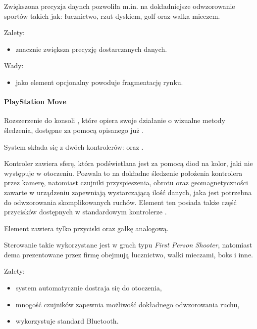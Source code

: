 Zwiększona precyzja daynch pozwoliła m.in. na dokładniejsze odwzorowanie sportów takich jak: łucznictwo, rzut dyskiem, golf oraz walka mieczem.

Zalety:
\begin{itemize}
  \item znacznie zwiększa precyzję dostarczanych danych.
\end{itemize}

Wady:
\begin{itemize}
  \item jako element opcjonalny powoduje fragmentację rynku.
\end{itemize}

\paragraph{PlayStation Move}
Rozszerzenie do konsoli , które opiera swoje działanie o wizualne metody śledzenia, dostępne za pomocą opisanego już .

System  składa się z dwóch kontrolerów:  oraz .

Kontroler  zawiera sferę, która podświetlana jest za pomocą diod na kolor, jaki nie występuje w otoczeniu. Pozwala to na dokładne śledzenie położenia kontrolera przez kamerę, natomiast czujniki przyspieszenia, obrotu oraz geomagnetyczności zawarte w urządzeniu zapewniają wystarczającą ilość danych, jaka jest potrzebna do odwzorowania skomplikowanych ruchów. Element ten posiada także część przycisków dostępnych w standardowym kontrolerze .

Element  zawiera tylko przyciski oraz gałkę analogową.

Sterowanie takie wykorzystane jest w grach typu \textsl{First Person Shooter}, natomiast dema prezentowane przez firmę  obejmują łucznictwo, walki mieczami, boks i inne.

Zalety:
\begin{itemize}
  \item system automatycznie dostraja się do otoczenia,
  \item mnogość czujników zapewnia możliwość dokładnego odwzorowania ruchu,
  \item wykorzystuje standard Bluetooth.
\end{itemize}

